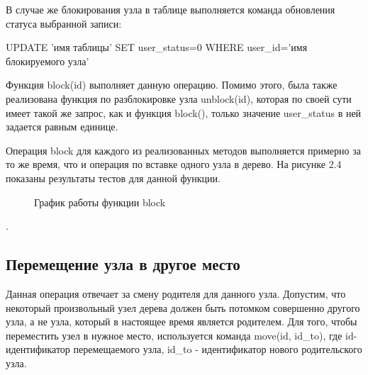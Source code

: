 \documentclass[a4paper,14pt]{extreport}
\theoremstyle{definition}
\begin{document}
В случае же блокирования узла в таблице выполняется команда обновления статуса выбранной записи:

UPDATE 'имя таблицы' SET user\_status=0 WHERE user\_id='имя блокируемого узла'

Функция block(\textdollar id) выполняет данную операцию. Помимо этого, была также реализована функция по разблокировке узла unblock(\textdollar id), которая по своей сути имеет такой же запрос, как и функция block(), только значение user\_status в ней задается равным единице.

Операция block для каждого из реализованных методов выполняется примерно за то же время, что и операция по вставке одного узла в дерево. На рисунке 2.4 показаны результаты тестов для данной функции.

\begin{figure}
\caption{График работы функции block}
\label{fig:3}
\end{figure}.
\subsection{Перемещение узла в другое место}
Данная операция отвечает за смену родителя для данного узла. Допустим, что некоторый произвольный узел дерева должен быть потомком совершенно другого узла, а не узла, который в настоящее время является родителем. Для того, чтобы переместить узел в нужное место, используется команда move(\textdollar id, \textdollar id\_to), где \textdollar id- идентификатор перемещаемого узла,  \textdollar id\_to - идентификатор нового родительского узла.
\end{document}
